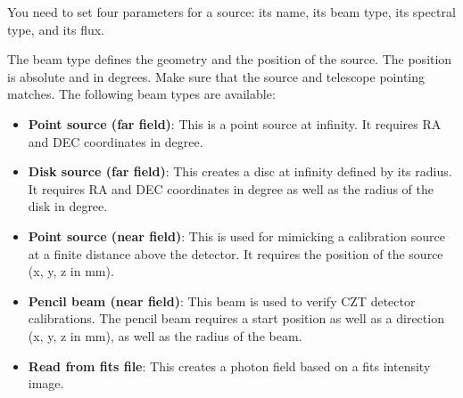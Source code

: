 You need to set four parameters for a source: its name, its beam type, its spectral type, and its flux.

The beam type defines the geometry and the position of the source. The position is absolute and in degrees. Make sure that the source and telescope pointing matches. The following beam types are available:
 \begin{itemize}
 \item \textbf{Point source (far field)}: This is a point source at infinity. It requires RA and DEC coordinates in degree.
 \item \textbf{Disk source (far field)}: This creates a disc at infinity defined by its radius. It requires RA and DEC coordinates in degree as well as the radius of the disk in degree.
 \item \textbf{Point source (near field)}: This is used for mimicking a calibration source at a finite distance above the detector. It requires the position of the source (x, y, z in mm).
 \item \textbf{Pencil beam (near field)}: This beam is used to verify CZT detector calibrations. The pencil beam requires a start position as well as a direction (x, y, z in mm), as well as the radius of the beam.  
 \item \textbf{Read from fits file}: This creates a photon field based on a fits intensity image.
 \end{itemize}
 
